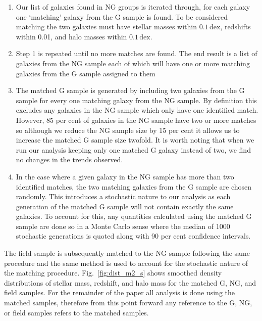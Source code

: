 \documentclass[a4paper,fleqn,usenatbib]{mnras}
\begin{document}
\begin{enumerate}
  \item Our list of galaxies found in NG groups is iterated through,
    for each galaxy one `matching' galaxy from the G sample is
    found.  To be considered matching the two galaxies must have
    stellar masses within $0.1\,\mathrm{dex}$, redshifts within 0.01,
    and halo masses within $0.1\,\mathrm{dex}$.

  \item Step 1 is repeated until no more matches are
    found.  The end result is a list of galaxies from the NG
    sample each of which will have one or more matching galaxies from
    the G sample assigned to them
  
  \item The matched G sample is generated by including two galaxies
    from the G sample for every one matching galaxy from the NG
    sample.  By definition this excludes any galaxies in the NG
    sample which only have one identified match.  However, 85 per cent
    of galaxies
    in the NG sample have two or more matches so although we reduce
    the NG sample size by 15 per cent it allows us to increase the
    matched G sample size twofold.  It is worth noting that when we
    run our analysis keeping only one matched G galaxy instead of two,
    we find no changes in the trends observed.

  \item In the case where a given galaxy in the NG sample has more
    than two identified matches, the two matching galaxies from the G
    sample are
    chosen randomly.  This introduces a stochastic nature to our
    analysis as each generation of the matched G sample will not
    contain exactly the same galaxies.  To account for this, any
    quantities calculated using the matched G sample are done so in a
    Monte Carlo sense where the median of 1000 stochastic generations
    is quoted along with 90 per cent confidence intervals.
\end{enumerate}

\noindent
The field sample is subsequently matched to the NG sample following
the same procedure and the same method is used to account for the
stochastic nature of the matching procedure.  Fig.~\ref{fig:dist_m2_s}
shows smoothed density
distributions of stellar mass, redshift, and halo mass for the matched
G, NG, and field samples.  For the remainder of the
paper all analysis is done using the matched samples, therefore from
this point forward any reference to the G, NG, or field samples refers
to the matched samples.
\end{document}
